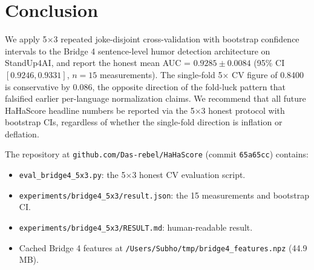 \documentclass[11pt, letterpaper]{article}
\begin{document}
\section{Conclusion}

We apply 5$\times$3 repeated joke-disjoint cross-validation with bootstrap confidence intervals to the Bridge 4 sentence-level humor detection architecture on StandUp4AI, and report the honest mean AUC = $0.9285 \pm 0.0084$ (95\% CI $[0.9246, 0.9331]$, $n=15$ measurements). The single-fold 5$\times$ CV figure of 0.8400 is conservative by $0.086$, the opposite direction of the fold-luck pattern that falsified earlier per-language normalization claims. We recommend that all future HaHaScore headline numbers be reported via the 5$\times$3 honest protocol with bootstrap CIs, regardless of whether the single-fold direction is inflation or deflation.


The repository at \texttt{github.com/Das-rebel/HaHaScore} (commit \texttt{65a65cc}) contains:
\begin{itemize}
\item \texttt{eval\_bridge4\_5x3.py}: the 5$\times$3 honest CV evaluation script.
\item \texttt{experiments/bridge4\_5x3/result.json}: the 15 measurements and bootstrap CI.
\item \texttt{experiments/bridge4\_5x3/RESULT.md}: human-readable result.
\item Cached Bridge 4 features at \texttt{/Users/Subho/tmp/bridge4\_features.npz} (44.9 MB).
\end{itemize}
\end{document}
